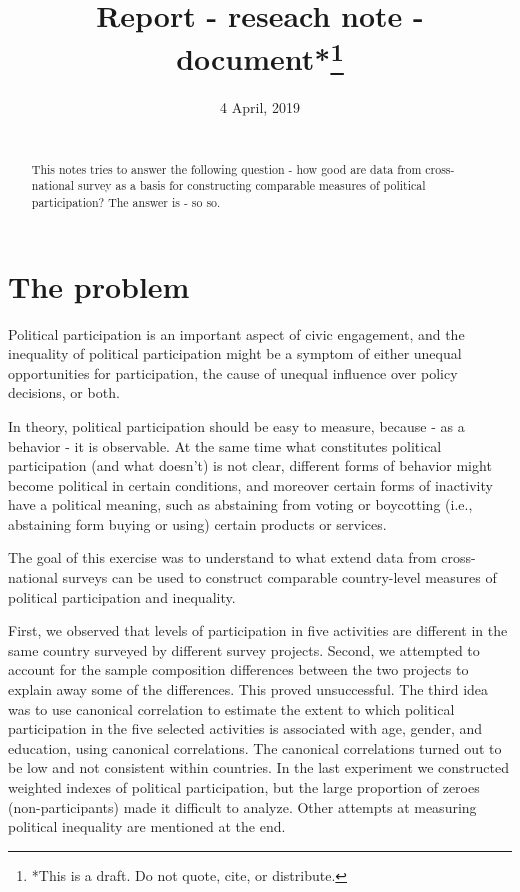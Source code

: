 \documentclass[12pt,]{article}
\title{\vspace{1cm}Report - reseach note - document*\footnote{*This is a draft. Do not quote, cite, or distribute.}\vspace{0.5cm}\\}
\author{}
\date{4 April, 2019\\
~\\}
\begin{document}
\maketitle
\begin{abstract}
\noindent{}This notes tries to answer the following question - how good are data from cross-national survey as a basis for constructing comparable measures of political participation? The answer is - so so.\vspace{.8cm}
\end{abstract}

\clearpage

\renewcommand{\baselinestretch}{0.5}\normalsize
\tableofcontents
\renewcommand{\baselinestretch}{1.1}\normalsize

\clearpage

\hypertarget{the-problem}{%
\section{The problem}\label{the-problem}}

Political participation is an important aspect of civic engagement, and the inequality of political participation might be a symptom of either unequal opportunities for participation, the cause of unequal influence over policy decisions, or both.

In theory, political participation should be easy to measure, because - as a behavior - it is observable. At the same time what constitutes political participation (and what doesn't) is not clear, different forms of behavior might become political in certain conditions, and moreover certain forms of inactivity have a political meaning, such as abstaining from voting or boycotting (i.e., abstaining form buying or using) certain products or services.

The goal of this exercise was to understand to what extend data from cross-national surveys can be used to construct comparable country-level measures of political participation and inequality.

First, we observed that levels of participation in five activities are different in the same country surveyed by different survey projects. Second, we attempted to account for the sample composition differences between the two projects to explain away some of the differences. This proved unsuccessful. The third idea was to use canonical correlation to estimate the extent to which political participation in the five selected activities is associated with age, gender, and education, using canonical correlations. The canonical correlations turned out to be low and not consistent within countries. In the last experiment we constructed weighted indexes of political participation, but the large proportion of zeroes (non-participants) made it difficult to analyze. Other attempts at measuring political inequality are mentioned at the end.
\end{document}
